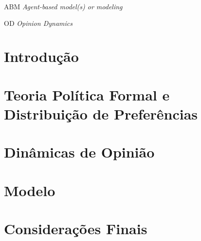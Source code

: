 \documentclass[
12pt,				%
openright,			%
oneside,			%
a4paper,			%
english, %
french, %
spanish, %
brazil, %
table,
xcdraw
]{abntex2}
\begin{document}
\listoftables*
\cleardoublepage


	

	
	
	
\begin{siglas}
\item[ABM] \textit{Agent-based model(s) or modeling}
  \item[OD] \textit{ Opinion Dynamics}
 
\end{siglas}
	\tableofcontents*
	\cleardoublepage
	\textual
	
	
	
\chapter*[Introdução]{Introdução}
      
\chapter{Teoria Política Formal e Distribuição de Preferências}


\chapter{Dinâmicas de Opinião}


 


 \chapter{Modelo}

 



\chapter*[Considerações Finais]{Considerações Finais}

%
  
\end{document}
